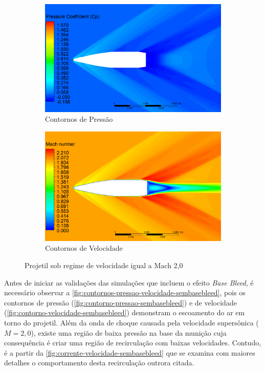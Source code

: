 \begin{figure}[!ht]
	\centering
	\begin{subfigure}[b]{0.47\textwidth}
        \centering
        \includegraphics[width=\textwidth]{contorno-pressao.png}
        \caption{Contornos de Pressão}
        \label{fig:contorno-pressao-sembasebleed}
    \end{subfigure}
    \hfill
	\begin{subfigure}[b]{0.47\textwidth}
        \centering
        \includegraphics[width=\textwidth]{contorno-velocidade.png}
        \caption{Contornos de Velocidade}
        \label{fig:contorno-velocidade-sembasebleed}
    \end{subfigure}
	\caption{Projetil sob regime de velocidade igual a Mach 2,0}
	\label{fig:contornos-pressao-velocidade-sembasebleed}
\end{figure}

Antes de iniciar as validações das simulações que incluem o efeito \textit{Base Bleed}, é necessário observar a \autoref{fig:contornos-pressao-velocidade-sembasebleed}, pois os contornos de pressão (\autoref{fig:contorno-pressao-sembasebleed}) e de velocidade (\autoref{fig:contorno-velocidade-sembasebleed}) demonstram o escoamento do ar em torno do projetil. Além da onda de choque causada pela velocidade supersônica ($M  = 2,0$), existe uma região de baixa pressão na base da munição cuja consequência é criar uma região de recirculação com baixas velocidades. Contudo, é a partir da \autoref{fig:corrente-velocidade-sembasebleed} que se examina com maiores detalhes o comportamento desta recirculação outrora citada.

